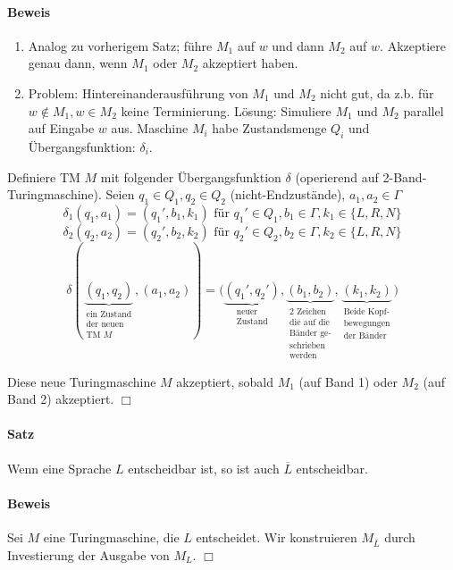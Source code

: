 \paragraph*{Beweis}
\begin{enumerate}
	\item Analog zu vorherigem Satz; führe $M_1$ auf $w$ und dann $M_2$ auf $w$. Akzeptiere genau dann, wenn $M_1$ oder $M_2$ akzeptiert haben.
	\item Problem: Hintereinanderausführung von $M_1$ und $M_2$ nicht gut, da z.b. für $w\not\in M_1,w\in M_2$ keine Terminierung. Lösung: Simuliere $M_1$ und $M_2$ parallel auf Eingabe $w$ aus. Maschine $M_i$ habe Zustandsmenge $Q_i$ und Übergangsfunktion: $\delta_i$.
\end{enumerate}
Definiere TM $M$ mit folgender Übergangsfunktion $\delta$ (operierend auf 2-Band-Turingmaschine). Seien $q_1 \in Q_1, q_2 \in Q_2$ (nicht-Endzustände), $a_1,a_2 \in \Gamma$
$$ \delta_1(q_1,a_1)=(q_1',b_1,k_1) \text{ für } q_1' \in Q_1,b_1 \in \Gamma,k_1\in\{L,R,N\} $$
$$ \delta_2(q_2,a_2)=(q_2',b_2,k_2) \text{ für } q_2' \in Q_2,b_2\in\Gamma,k_2\in\{L,R,N\} $$
$$ \delta(
	\underbrace{(q_1,q_2)}_{\substack{\text{ein Zustand} \\ \text{der neuen} \\ \text{TM } M}},
	(a_1,a_2))=\Big(
	\underbrace{(q_1',q_2')}_{\substack{\text{neuer} \\ \text{Zustand}}},
	\underbrace{(b_1,b_2)}_{\substack{\text{2 Zeichen} \\ \text{die auf die} \\ \text{Bänder ge-} \\ \text{schrieben} \\ \text{werden}}},
	\underbrace{(k_1,k_2)}_{\substack{\text{Beide Kopf-} \\ \text{bewegungen} \\ \text{der Bänder}}}
	\Big) $$

Diese neue Turingmaschine $M$ akzeptiert, sobald $M_1$ (auf Band 1) oder $M_2$ (auf Band 2) akzeptiert. $\Box$

\paragraph*{Satz} Wenn eine Sprache $L$ entscheidbar ist, so ist auch $\overline{L}$ entscheidbar.

\paragraph*{Beweis} Sei $M$ eine Turingmaschine, die $L$ entscheidet. Wir konstruieren $M_{\overline{L}}$ durch Investierung der Ausgabe von $M_L$. $\Box$

